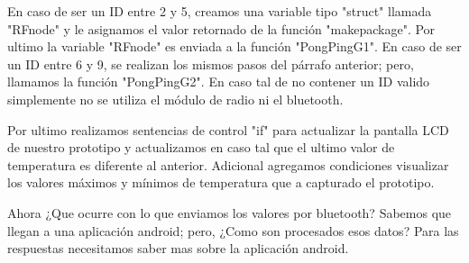 \par \noindent
En caso de ser un ID entre 2 y 5, creamos una variable tipo "struct" llamada "RFnode" y le asignamos el valor retornado de la función "makepackage". Por ultimo la variable "RFnode" es enviada a la función "PongPingG1". En caso de ser un ID entre 6 y 9, se realizan los mismos pasos del párrafo anterior; pero, llamamos la función "PongPingG2". En caso tal de no contener un ID valido simplemente no se utiliza el módulo de radio ni el bluetooth.

\par \noindent
Por ultimo realizamos sentencias de control "if" para actualizar la pantalla LCD de nuestro prototipo y actualizamos en caso tal que el ultimo valor de temperatura es diferente al anterior. Adicional agregamos condiciones visualizar los valores máximos y mínimos de temperatura que a capturado el prototipo.

\par \noindent
Ahora ¿Que ocurre con lo que enviamos los valores por bluetooth? Sabemos que llegan a una aplicación android; pero, ¿Como son procesados esos datos? Para las respuestas necesitamos saber mas sobre la aplicación android.